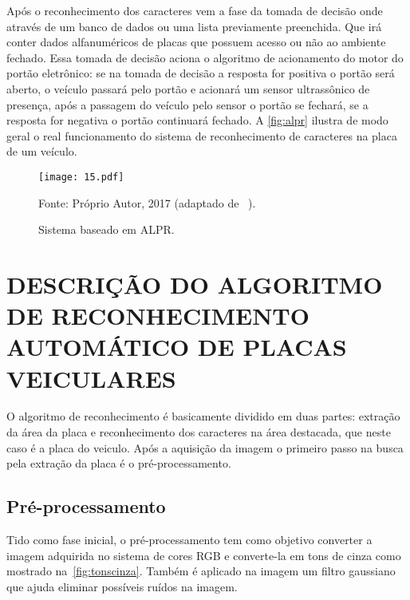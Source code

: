Após o reconhecimento dos caracteres vem a fase da tomada de decisão onde através de um banco de dados ou uma lista previamente preenchida. Que irá conter dados alfanuméricos de placas que possuem acesso ou não ao ambiente fechado. Essa tomada de decisão aciona o algoritmo de acionamento do motor do portão eletrônico: se na tomada de decisão a resposta for positiva o portão será aberto, o veículo passará pelo portão e acionará um sensor ultrassônico de presença, após a passagem do veículo pelo sensor o portão se fechará, se a resposta for negativa o portão continuará fechado. A \autoref{fig:alpr} ilustra de modo geral o real funcionamento do sistema de reconhecimento de caracteres na placa de um veículo. 

\begin{figure}[htb]
	\centering
	\caption{{\footnotesize Sistema baseado em ALPR.}}   %
	\label{fig:alpr}
	\texttt{[image: 15.pdf]}
	
	{\footnotesize Fonte: Próprio Autor, 2017 (adaptado de ~).}
\end{figure}

\section{\uppercase{Descrição do Algoritmo de Reconhecimento Automático de Placas Veiculares}}

O algoritmo de reconhecimento é basicamente dividido em duas partes: extração da área da placa e reconhecimento dos caracteres na área destacada, que neste caso é a placa do veiculo. Após a aquisição da imagem o primeiro passo na busca pela extração da placa é o pré-processamento.

\subsection{\textbf{Pré-processamento}}

Tido como fase inicial, o pré-processamento tem como objetivo converter a imagem adquirida no sistema de cores RGB e converte-la em tons de cinza como mostrado na~\autoref{fig:tonscinza}. Também é aplicado na imagem um filtro gaussiano que ajuda eliminar possíveis ruídos na imagem.

